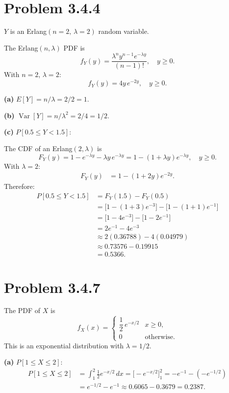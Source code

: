 \documentclass[11pt]{article}
\newcommand{\Var}{\operatorname{Var}}
\begin{document}
\section*{Problem 3.4.4}

$Y$ is an Erlang$(n=2,\,\lambda=2)$ random variable.

The Erlang$(n,\lambda)$ PDF is
\[
f_Y(y)=\frac{\lambda^n y^{n-1}e^{-\lambda y}}{(n-1)!},\quad y\ge 0.
\]
With $n=2$, $\lambda=2$:
\[
f_Y(y)=4y\,e^{-2y},\quad y\ge 0.
\]

\textbf{(a)} $E[Y] = n/\lambda = 2/2 = \boxed{1}$.

\textbf{(b)} $\Var[Y] = n/\lambda^2 = 2/4 = \boxed{1/2}$.

\textbf{(c)} $P[0.5\le Y < 1.5]$:

The CDF of an Erlang$(2,\lambda)$ is
\[
F_Y(y)=1-e^{-\lambda y}-\lambda y\,e^{-\lambda y}=1-(1+\lambda y)e^{-\lambda y},\quad y\ge 0.
\]
With $\lambda=2$:
\begin{align*}
F_Y(y) &= 1-(1+2y)e^{-2y}.
\end{align*}
Therefore:
\begin{align*}
P[0.5\le Y<1.5] &= F_Y(1.5)-F_Y(0.5)\\
&= \bigl[1-(1+3)e^{-3}\bigr]-\bigl[1-(1+1)e^{-1}\bigr]\\
&= \bigl[1-4e^{-3}\bigr]-\bigl[1-2e^{-1}\bigr]\\
&= 2e^{-1}-4e^{-3}\\
&\approx 2(0.36788)-4(0.04979)\\
&\approx 0.73576 - 0.19915\\
&= \boxed{0.5366}.
\end{align*}

\section*{Problem 3.4.7}

The PDF of $X$ is
\[
f_X(x)=\begin{cases}\dfrac{1}{2}\,e^{-x/2} & x\ge 0,\\[6pt] 0 & \text{otherwise.}\end{cases}
\]
This is an exponential distribution with $\lambda=1/2$.

\medskip
\textbf{(a)} $P[1\le X\le 2]$:
\begin{align*}
P[1\le X\le 2] &= \int_1^2 \frac{1}{2}e^{-x/2}\,dx = \bigl[-e^{-x/2}\bigr]_1^2 = -e^{-1}-(-e^{-1/2})\\
&= e^{-1/2}-e^{-1} \approx 0.6065-0.3679 = \boxed{0.2387}.
\end{align*}
\end{document}

